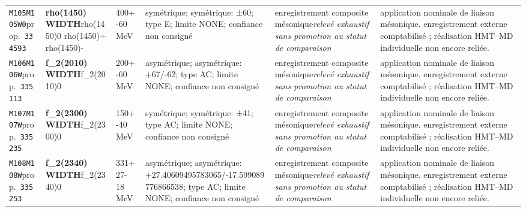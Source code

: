 \begin{landscape}
\begin{longtable}{L{1.85cm}L{4.45cm}L{2.35cm}L{4.05cm}L{3.35cm}L{7.15cm}}
\texttt{M105}\newline \texttt{M105W0}\newline prop.\ \texttt{334593} & \textbf{rho(1450) WIDTH}\newline rho(1450)0 \textbar{}\allowbreak{} rho(1450)+ \textbar{}\allowbreak{} rho(1450)- & 400+-60\,MeV & symétrique; symétrique: ±60; type E; limite NONE; confiance non consigné & enregistrement composite mésonique\newline \emph{relevé exhaustif sans promotion au statut de comparaison} & application nominale de liaison mésonique. enregistrement externe comptabilisé ; réalisation HMT--MD individuelle non encore reliée. \\
\texttt{M106}\newline \texttt{M106W}\newline prop.\ \texttt{335113} & \textbf{f\_\allowbreak{}2(2010) WIDTH}\newline f\_\allowbreak{}2(2010)0 & 200+-60\,MeV & asymétrique; asymétrique: +67/-62; type AC; limite NONE; confiance non consigné & enregistrement composite mésonique\newline \emph{relevé exhaustif sans promotion au statut de comparaison} & application nominale de liaison mésonique. enregistrement externe comptabilisé ; réalisation HMT--MD individuelle non encore reliée. \\
\texttt{M107}\newline \texttt{M107W}\newline prop.\ \texttt{335235} & \textbf{f\_\allowbreak{}2(2300) WIDTH}\newline f\_\allowbreak{}2(2300)0 & 150+-40\,MeV & symétrique; symétrique: ±41; type AC; limite NONE; confiance non consigné & enregistrement composite mésonique\newline \emph{relevé exhaustif sans promotion au statut de comparaison} & application nominale de liaison mésonique. enregistrement externe comptabilisé ; réalisation HMT--MD individuelle non encore reliée. \\
\texttt{M108}\newline \texttt{M108W}\newline prop.\ \texttt{335253} & \textbf{f\_\allowbreak{}2(2340) WIDTH}\newline f\_\allowbreak{}2(2340)0 & 331+27-18\,MeV & asymétrique; asymétrique: +27.40609495783065/-17.599089776866538; type AC; limite NONE; confiance non consigné & enregistrement composite mésonique\newline \emph{relevé exhaustif sans promotion au statut de comparaison} & application nominale de liaison mésonique. enregistrement externe comptabilisé ; réalisation HMT--MD individuelle non encore reliée. \\

\end{longtable}
\end{landscape}
